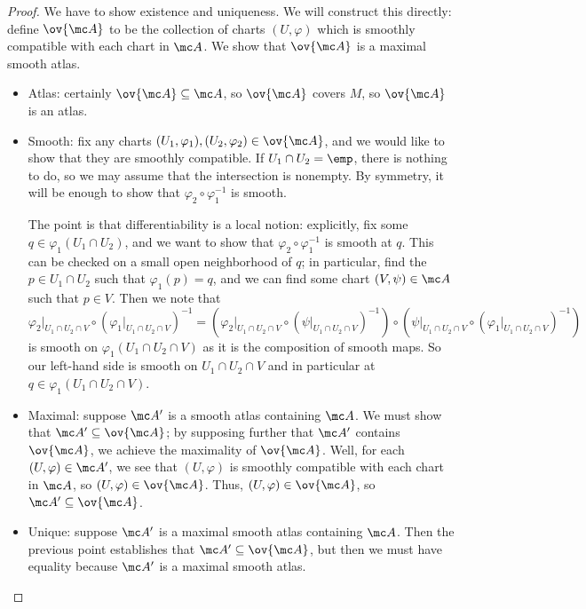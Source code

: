 \documentclass[../notes.tex]{subfiles}
\begin{document}
\begin{proof}
	We have to show existence and uniqueness. We will construct this directly: define $\ov{\mc A}$ to be the collection of charts $(U,\varphi)$ which is smoothly compatible with each chart in $\mc A$. We show that $\ov{\mc A}$ is a maximal smooth atlas.
	\begin{itemize}
		\item Atlas: certainly $\ov{\mc A}\subseteq\mc A$, so $\ov{\mc A}$ covers $M$, so $\ov{\mc A}$ is an atlas.

		\item Smooth: fix any charts $(U_1,\varphi_1),(U_2,\varphi_2)\in\ov{\mc A}$, and we would like to show that they are smoothly compatible. If $U_1\cap U_2=\emp$, there is nothing to do, so we may assume that the intersection is nonempty. By symmetry, it will be enough to show that $\varphi_2\circ\varphi_1^{-1}$ is smooth.
		
		The point is that differentiability is a local notion: explicitly, fix some $q\in\varphi_1(U_1\cap U_2)$, and we want to show that $\varphi_2\circ\varphi_1^{-1}$ is smooth at $q$. This can be checked on a small open neighborhood of $q$; in particular, find the $p\in U_1\cap U_2$ such that $\varphi_1(p)=q$, and we can find some chart $(V,\psi)\in\mc A$ such that $p\in V$. Then we note that
		\[\varphi_2|_{U_1\cap U_2\cap V}\circ(\varphi_1|_{U_1\cap U_2\cap V})^{-1}=\left(\varphi_2|_{U_1\cap U_2\cap V}\circ(\psi|_{U_1\cap U_2\cap V})^{-1}\right)\circ\left(\psi|_{U_1\cap U_2\cap V}\circ(\varphi_1|_{U_1\cap U_2\cap V})^{-1}\right)\]
		is smooth on $\varphi_1(U_1\cap U_2\cap V)$ as it is the composition of smooth maps. So our left-hand side is smooth on $U_1\cap U_2\cap V$ and in particular at $q\in\varphi_1(U_1\cap U_2\cap V)$.

		\item Maximal: suppose $\mc A'$ is a smooth atlas containing $\mc A$. We must show that $\mc A'\subseteq\ov{\mc A}$; by supposing further that $\mc A'$ contains $\ov{\mc A}$, we achieve the maximality of $\ov{\mc A}$. Well, for each $(U,\varphi)\in\mc A'$, we see that $(U,\varphi)$ is smoothly compatible with each chart in $\mc A$, so $(U,\varphi)\in\ov{\mc A}$. Thus, $(U,\varphi)\in\ov{\mc A}$, so $\mc A'\subseteq\ov{\mc A}$.

		\item Unique: suppose $\mc A'$ is a maximal smooth atlas containing $\mc A$. Then the previous point establishes that $\mc A'\subseteq\ov{\mc A}$, but then we must have equality because $\mc A'$ is a maximal smooth atlas.
		\qedhere
	\end{itemize}
\end{proof}
\end{document}
